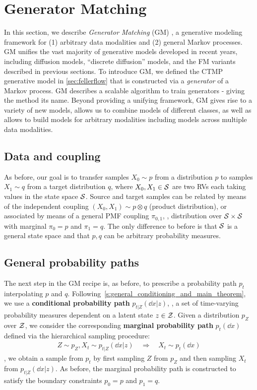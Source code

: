 \documentclass{fairmeta}
\newcommand{\highlight}[1]{{\color{metablue} \textbf{#1}}}
\numberwithin{equation}{section}
\begin{document}
\newpage
\section{Generator Matching}\label{sec:generatormatching}
In this section, we describe \emph{Generator Matching} (GM) \citep{holderrieth2024gm}, a generative modeling framework for (1) arbitrary data modalities and (2) general Markov processes. GM unifies the vast majority of  generative models developed in recent years, including diffusion models, ``discrete diffusion'' models, and the FM variants described in previous sections. To introduce GM, we defined the CTMP generative model in \cref{sec:fellerflow} that is constructed via a \emph{generator} of a Markov process. GM describes a scalable algorithm to train generators - giving the method its name. Beyond providing a unifying framework, GM gives rise to a variety of new models, allows us to combine models of different classes, as well as allows to build models for arbitrary modalities including models across multiple data modalities.

\subsection{Data and coupling}
As before, our goal is to transfer samples $X_0\sim p$ from a distribution $p$ to samples $X_1\sim q$ from a target distribution $q$, where $X_0,X_1\in{\mathcal{S}}$ are two RVs each taking values in the state space ${\mathcal{S}}$.
Source and target samples can be related by means of the independent coupling $(X_0,X_1)\sim p\otimes q$ (product distribution), or associated by means of a general PMF coupling $\pi_{0,1}$, \ie, distribution over ${\mathcal{S}}\times{\mathcal{S}}$ with marginal $\pi_{0}=p$ and $\pi_{1}=q$.
The only difference to before is that ${\mathcal{S}}$ is a general state space and that $p,q$ can be arbitrary probability measures.

\subsection{General probability paths}

The next step in the GM recipe is, as before, to prescribe a probability path $p_t$ interpolating $p$ and $q$.
Following~\cref{s:general_conditioning_and_main_theorem}, we use a \highlight{conditional probability path} $p_{t|Z}(\dd x|z)$, \ie, a set of time-varying probability measures dependent on a latent state $z\in{\mathcal{Z}}$. Given a distribution $p_{Z}$ over ${\mathcal{Z}}$, we consider the corresponding \highlight{marginal probability path} $p_t(\dd x)$ defined via the hierarchical sampling procedure:
\begin{align*}
Z\sim p_{Z}, X_t\sim p_{t|Z}(\dd x|z) \quad \Rightarrow \quad X_t\sim p_t(\dd x)
\end{align*}
\ie, we obtain a sample from $p_t$ by first sampling $Z$ from $p_{Z}$ and then sampling $X_t$ from $p_{t|Z}(\dd x|z)$. As before, the marginal probability path is constructed to satisfy the boundary constraints $p_0=p$ and $p_1=q$.
\end{document}
